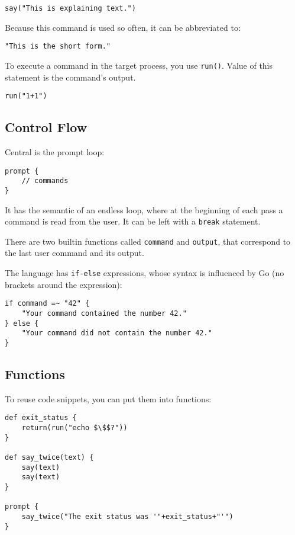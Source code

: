 \documentclass[twoside,parskip]{scrreprt}
\begin{document}
\begin{lstlisting}
say("This is explaining text.")
\end{lstlisting}

Because this command is used so often, it can be abbreviated to:

\begin{lstlisting}
"This is the short form."
\end{lstlisting}

To execute a command in the target process, you use \texttt{run()}. Value of this statement is the command's output.

\begin{lstlisting}
run("1+1")
\end{lstlisting}

\subsection{Control Flow}

Central is the prompt loop:

\begin{lstlisting}
prompt {
    // commands
}
\end{lstlisting}

It has the semantic of an endless loop, where at the beginning of each pass a command is read from the user. It can be left with a \texttt{break} statement.

There are two builtin functions called \texttt{command} and \texttt{output}, that correspond to the last user command and its output.

The language has \texttt{if-else} expressions, whose syntax is influenced by Go (no brackets around the expression):

\begin{lstlisting}
if command =~ "42" {
    "Your command contained the number 42."
} else {
    "Your command did not contain the number 42."
}
\end{lstlisting}

\subsection{Functions}

To reuse code snippets, you can put them into functions:

\begin{lstlisting}[mathescape]
def exit_status {
    return(run("echo $\$$?"))
}

def say_twice(text) {
    say(text)
    say(text)
}

prompt {
    say_twice("The exit status was '"+exit_status+"'")
}
\end{lstlisting}
\end{document}
